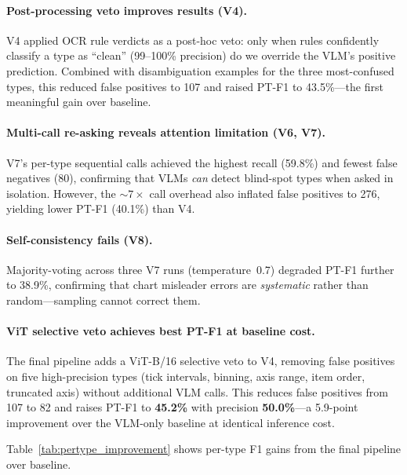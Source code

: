 \paragraph{Post-processing veto improves results (V4).}
V4 applied OCR rule verdicts as a post-hoc veto: only when rules confidently classify a type as ``clean'' (99--100\% precision) do we override the VLM's positive prediction. Combined with disambiguation examples for the three most-confused types, this reduced false positives to 107 and raised PT-F1 to 43.5\%---the first meaningful gain over baseline.

\paragraph{Multi-call re-asking reveals attention limitation (V6, V7).}
V7's per-type sequential calls achieved the highest recall (59.8\%) and fewest false negatives (80), confirming that VLMs \textit{can} detect blind-spot types when asked in isolation. However, the ${\sim}7\times$ call overhead also inflated false positives to 276, yielding lower PT-F1 (40.1\%) than V4.

\paragraph{Self-consistency fails (V8).}
Majority-voting across three V7 runs (temperature~0.7) degraded PT-F1 further to 38.9\%, confirming that chart misleader errors are \textit{systematic} rather than random---sampling cannot correct them.

\paragraph{ViT selective veto achieves best PT-F1 at baseline cost.}
The final pipeline adds a ViT-B/16 selective veto to V4, removing false positives on five high-precision types (tick intervals, binning, axis range, item order, truncated axis) without additional VLM calls. This reduces false positives from 107 to 82 and raises PT-F1 to \textbf{45.2\%} with precision \textbf{50.0\%}---a 5.9-point improvement over the VLM-only baseline at identical inference cost.

Table~\ref{tab:pertype_improvement} shows per-type F1 gains from the final pipeline over baseline.


